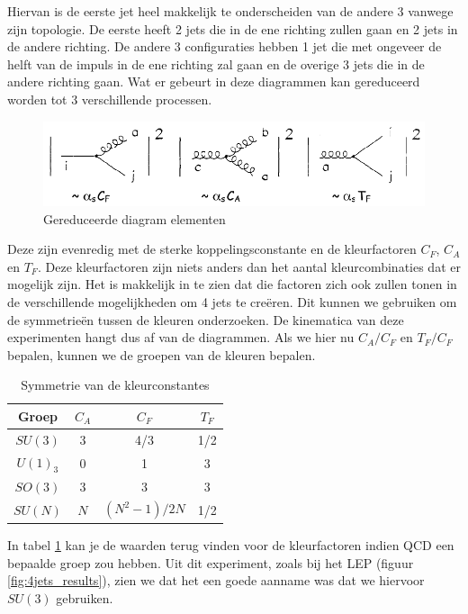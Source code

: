 \documentclass[../main.tex]{subfiles}
\begin{document}
Hiervan is de eerste jet heel makkelijk te onderscheiden van de andere 3 vanwege zijn topologie. De eerste heeft 2 jets die in de ene richting zullen gaan en 2 jets in de andere richting. De andere 3 configuraties hebben 1 jet die met ongeveer de helft van de impuls in de ene richting zal gaan en de overige 3 jets die in de andere richting gaan. Wat er gebeurt in deze diagrammen kan gereduceerd worden tot 3 verschillende processen.

\begin{figure}[h]
    \centering
    \includegraphics[width=0.8\linewidth]{QCD/reduced_events.png}
    \caption{Gereduceerde diagram elementen}%
    \label{fig:reduced_events}
\end{figure}

Deze zijn evenredig met de sterke koppelingsconstante en de kleurfactoren $C_F$, $C_A$ en $T_F$. Deze kleurfactoren zijn niets anders dan het aantal kleurcombinaties dat er mogelijk zijn. Het is makkelijk in te zien dat die factoren zich ook zullen tonen in de verschillende mogelijkheden om 4 jets te creëren. Dit kunnen we gebruiken om de symmetrieën tussen de kleuren onderzoeken. De kinematica van deze experimenten hangt dus af van de diagrammen. Als we hier nu $C_A/C_F$ en $T_F/C_F$ bepalen, kunnen we de groepen van de kleuren bepalen.

\begin{table}[h]
    \centering
    \caption{Symmetrie van de kleurconstantes}
    \label{tab:sym_kleurfact}
    \begin{tabular}{|c|c|c|c|}
        \hline
        Groep   & $C_A$ & $C_F$         & $T_F$ \\
        \hline
        $SU(3)$ & 3     & 4/3           & 1/2   \\
        $U(1)_3$& 0     & 1             & 3     \\
        $SO(3)$ & 3     & 3             & 3     \\
        $SU(N)$ & $N$   & $(N^2-1)/2N$  & 1/2   \\
        \hline
    \end{tabular}
\end{table}

In tabel \ref{tab:sym_kleurfact} kan je de waarden terug vinden voor de kleurfactoren indien QCD een bepaalde groep zou hebben. Uit dit experiment, zoals bij het LEP (figuur \ref{fig:4jets_results}), zien we dat het een goede aanname was dat we hiervoor $SU(3)$ gebruiken.
\end{document}

